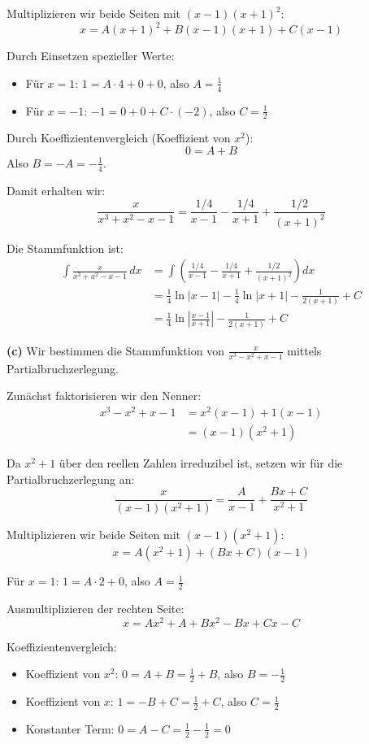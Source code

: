 \documentclass{article}
\begin{document}
Multiplizieren wir beide Seiten mit $(x-1)(x+1)^2$:
$$x = A(x+1)^2 + B(x-1)(x+1) + C(x-1)$$

Durch Einsetzen spezieller Werte:
\begin{itemize}
\item Für $x = 1$: $1 = A \cdot 4 + 0 + 0$, also $A = \frac{1}{4}$
\item Für $x = -1$: $-1 = 0 + 0 + C \cdot (-2)$, also $C = \frac{1}{2}$
\end{itemize}

Durch Koeffizientenvergleich (Koeffizient von $x^2$):
$$0 = A + B$$
Also $B = -A = -\frac{1}{4}$.

Damit erhalten wir:
$$\frac{x}{x^3+x^2-x-1} = \frac{1/4}{x-1} - \frac{1/4}{x+1} + \frac{1/2}{(x+1)^2}$$

Die Stammfunktion ist:
\begin{align*}
\int \frac{x}{x^3+x^2-x-1} \, dx &= \int \left(\frac{1/4}{x-1} - \frac{1/4}{x+1} + \frac{1/2}{(x+1)^2}\right) dx\\
&= \frac{1}{4}\ln|x-1| - \frac{1}{4}\ln|x+1| - \frac{1}{2(x+1)} + C\\
&= \frac{1}{4}\ln\left|\frac{x-1}{x+1}\right| - \frac{1}{2(x+1)} + C
\end{align*}

\textbf{(c)} Wir bestimmen die Stammfunktion von $\frac{x}{x^3-x^2+x-1}$ mittels Partialbruchzerlegung.

Zunächst faktorisieren wir den Nenner:
\begin{align*}
x^3 - x^2 + x - 1 &= x^2(x-1) + 1(x-1)\\
&= (x-1)(x^2+1)
\end{align*}

Da $x^2 + 1$ über den reellen Zahlen irreduzibel ist, setzen wir für die Partialbruchzerlegung an:
$$\frac{x}{(x-1)(x^2+1)} = \frac{A}{x-1} + \frac{Bx + C}{x^2+1}$$

Multiplizieren wir beide Seiten mit $(x-1)(x^2+1)$:
$$x = A(x^2+1) + (Bx + C)(x-1)$$

Für $x = 1$: $1 = A \cdot 2 + 0$, also $A = \frac{1}{2}$

Ausmultiplizieren der rechten Seite:
$$x = Ax^2 + A + Bx^2 - Bx + Cx - C$$

Koeffizientenvergleich:
\begin{itemize}
\item Koeffizient von $x^2$: $0 = A + B = \frac{1}{2} + B$, also $B = -\frac{1}{2}$
\item Koeffizient von $x$: $1 = -B + C = \frac{1}{2} + C$, also $C = \frac{1}{2}$
\item Konstanter Term: $0 = A - C = \frac{1}{2} - \frac{1}{2} = 0$ \checkmark
\end{itemize}
\end{document}
